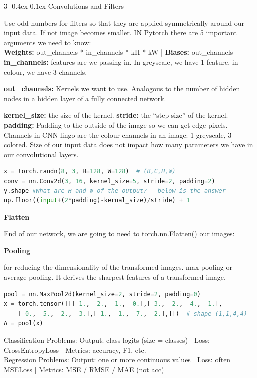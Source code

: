 \documentclass[8pt,landscape]{article}
\makeatletter
\renewcommand{\subsection}{\@startsection{subsection}{2}{0pt}%
    {-0.4ex}%
    {0.1ex}%
    {\fontsize{8}{9}\bfseries\color{blue}}}
\newcommand{\smalltext}[1]{%
  {\fontsize{8}{9}\selectfont\sloppy #1\par}%
}
\makeatother
\begin{document}
\begin{multicols}{3}
\subsection{Convolutions and Filters}
\smalltext{
Use odd numbers for filters so that they are applied symmetrically around our input data. If not image becomes smaller.
IN Pytorch there are 5 important arguments we need to know: \\
\textbf{Weights:} out\_channels * in\_channels * kH * kW |
\textbf{Biases:} out\_channels \\
\textbf{in\_channels:} features are we passing in. In greyscale, we have 1 feature, in colour, we have 3 channels.

\textbf{out\_channels:} Kernels we want to use. Analogous to the number of hidden nodes in a hidden layer of a fully connected network.

\textbf{kernel\_size:} the size of the kernel.
\textbf{stride:} the “step-size” of the kernel.
\textbf{padding:} Padding to the outside of the image so we can get edge pixels.
Channels in CNN lingo are the colour channels in an image: 1 greyscale, 3 colored. 
Size of our input data does not impact how many parameters we have in our convolutional layers.
}
\begin{lstlisting}[language=Python]
x = torch.randn(8, 3, H=128, W=128)  # (B,C,H,W)
conv = nn.Conv2d(3, 16, kernel_size=5, stride=2, padding=2)
y.shape #What are H and W of the output? - below is the answer
np.floor((input+(2*padding)-kernal_size)/stride) + 1 
\end{lstlisting}

\textbf{Flatten}
\smalltext{
    End of our network, we are going to need to torch.nn.Flatten() our images:
}
\textbf{Pooling}
\smalltext{
for reducing the dimensionality of the transformed images. max pooling or average pooling.
It derives the sharpest features of a transformed image.
}
\begin{lstlisting}[language=Python]
pool = nn.MaxPool2d(kernel_size=2, stride=2, padding=0)
x = torch.tensor([[[ 1.,  2., -1.,  0.],[ 3., -2.,  4.,  1.],
    [ 0.,  5.,  2., -3.],[ 1.,  1.,  7.,  2.],]])  # shape (1,1,4,4)
A = pool(x)
\end{lstlisting}
\smalltext{
Classification Problems: Output: class logits (size = classes) | Loss: CrossEntropyLoss | Metrics: accuracy, F1, etc. \\
Regression Problems: Output: one or more continuous values | Loss: often MSELoss | Metrics: MSE / RMSE / MAE (not acc)
}

\end{multicols}
\end{document}
